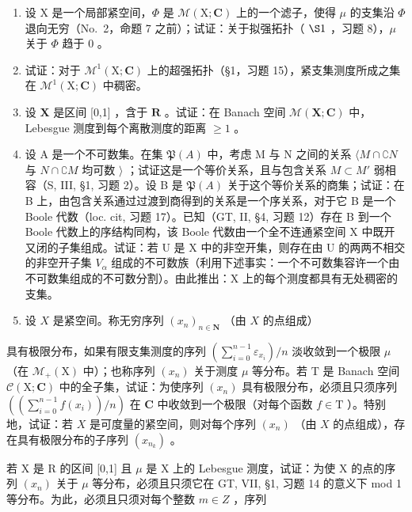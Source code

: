 \begin{enumerate}
\def\labelenumi{\arabic{enumi})}
\item
  设 X 是一个局部紧空间，\(\Phi\) 是 \(\mathcal{M}(\mathrm{X};\mathbf{C})\) 上的一个滤子，使得 \(\mu\) 的支集沿 \(\Phi\) 退向无穷（No.~2，命题 7 之前）；试证：关于拟强拓扑（ \(\S1\) ，习题 8），\(\mu\) 关于 \(\Phi\) 趋于 0 。
\item
  试证：对于 \(\mathcal{M}^1 (\mathrm{X};\mathbf{C})\) 上的超强拓扑（§1，习题 15），紧支集测度所成之集在 \(\mathcal{M}^1 (\mathrm{X};\mathbf{C})\) 中稠密。
\item
  设 \(\mathbf{X}\) 是区间 {[}0,1{]} ，含于 \(\mathbf{R}\) 。试证：在 Banach 空间 \(\mathcal{M}(\mathbf{X};\mathbf{C})\) 中，Lebesgue 测度到每个离散测度的距离 \(\geqslant 1\) 。
\item
  设 A 是一个不可数集。在集 \(\mathfrak{P}(A)\) 中，考虑 M 与 N 之间的关系 \(\langle M \cap \complement N\) 与 \(N \cap \complement M\) 均可数 \(\rangle\) ；试证这是一个等价关系，且与包含关系 \(M \subset M'\) 弱相容（S, III, §1, 习题 2）。设 B 是 \(\mathfrak{P}(A)\) 关于这个等价关系的商集；试证：在 B 上，由包含关系通过过渡到商得到的关系是一个序关系，对于它 B 是一个 Boole 代数（loc. cit, 习题 17）。已知（GT, II, §4, 习题 12）存在 B 到一个 Boole 代数上的序结构同构，该 Boole 代数由一个全不连通紧空间 X 中既开又闭的子集组成。试证：若 U 是 X 中的非空开集，则存在由 U 的两两不相交的非空开子集 \(V_{\alpha}\) 组成的不可数族（利用下述事实：一个不可数集容许一个由不可数集组成的不可数分割）。由此推出：X 上的每个测度都具有无处稠密的支集。
\item
  设 \(X\) 是紧空间。称无穷序列 \((x_{n})_{n\in \mathbf{N}}\) （由 \(X\) 的点组成）
\end{enumerate}

具有极限分布，如果有限支集测度的序列 \(\left(\sum_{i=0}^{n-1} \varepsilon_{x_i}\right)/n\) 淡收敛到一个极限 \(\mu\) （在 \(\mathcal{M}_{+}(\mathrm{X})\) 中）；也称序列 \((x_{n})\) 关于测度 \(\mu\) 等分布。若 \(\mathrm{T}\) 是 Banach 空间 \(\mathcal{C}(\mathrm{X};\mathbf{C})\) 中的全子集，试证：为使序列 \((x_{n})\) 具有极限分布，必须且只须序列 \(\left(\left(\sum_{i=0}^{n-1} f(x_i)\right)/n\right)\) 在 \(\mathbf{C}\) 中收敛到一个极限（对每个函数 \(f \in \mathrm{T}\) ）。特别地，试证：若 \(X\) 是可度量的紧空间，则对每个序列 \((x_{n})\) （由 \(X\) 的点组成），存在具有极限分布的子序列 \((x_{n_k})\) 。

若 X 是 R 的区间 {[}0,1{]} 且 \(\mu\) 是 X 上的 Lebesgue 测度，试证：为使 X 的点的序列 \((x_{n})\) 关于 \(\mu\) 等分布，必须且只须它在 GT, VII, §1, 习题 14 的意义下 mod 1 等分布。为此，必须且只须对每个整数 \(m \in Z\) ，序列

